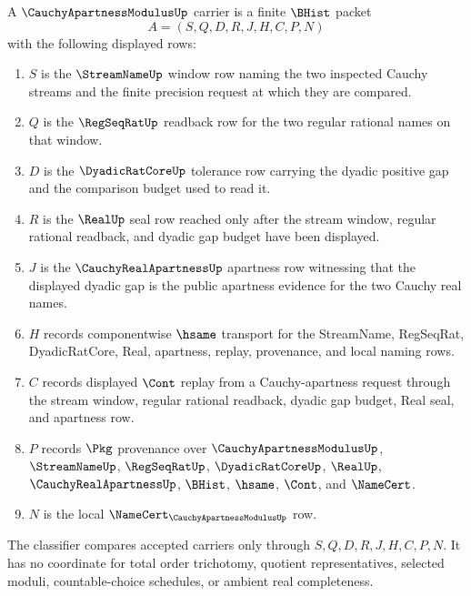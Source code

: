 \begin{definition}
\label{def:cauchy-apartness-modulus-carrier}
A $\CauchyApartnessModulusUp$ carrier is a finite $\BHist$ packet
$$
A=(S,Q,D,R,J,H,C,P,N)
$$
with the following displayed rows:
\begin{enumerate}
\item $S$ is the $\StreamNameUp$ window row naming the two inspected Cauchy streams and the finite precision request at which they are compared.
\item $Q$ is the $\RegSeqRatUp$ readback row for the two regular rational names on that window.
\item $D$ is the $\DyadicRatCoreUp$ tolerance row carrying the dyadic positive gap and the comparison budget used to read it.
\item $R$ is the $\RealUp$ seal row reached only after the stream window, regular rational readback, and dyadic gap budget have been displayed.
\item $J$ is the $\CauchyRealApartnessUp$ apartness row witnessing that the displayed dyadic gap is the public apartness evidence for the two Cauchy real names.
\item $H$ records componentwise $\hsame$ transport for the StreamName, RegSeqRat, DyadicRatCore, Real, apartness, replay, provenance, and local naming rows.
\item $C$ records displayed $\Cont$ replay from a Cauchy-apartness request through the stream window, regular rational readback, dyadic gap budget, Real seal, and apartness row.
\item $P$ records $\Pkg$ provenance over $\CauchyApartnessModulusUp$, $\StreamNameUp$, $\RegSeqRatUp$, $\DyadicRatCoreUp$, $\RealUp$, $\CauchyRealApartnessUp$, $\BHist$, $\hsame$, $\Cont$, and $\NameCert$.
\item $N$ is the local $\NameCert_{\CauchyApartnessModulusUp}$ row.
\end{enumerate}
The classifier compares accepted carriers only through $S,Q,D,R,J,H,C,P,N$. It has no coordinate for total order trichotomy, quotient representatives, selected moduli, countable-choice schedules, or ambient real completeness.
\end{definition}

